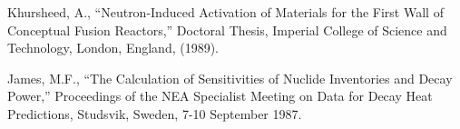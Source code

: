 \begin{thebibliography}{100}
 Khursheed, A., ``Neutron-Induced Activation of
  Materials for the First Wall of Conceptual Fusion Reactors,''
  Doctoral Thesis, Imperial College of Science and Technology, London,
  England, (1989).
    
 James, M.F., ``The Calculation of Sensitivities
  of Nuclide Inventories and Decay Power,'' Proceedings of the NEA
  Specialist Meeting on Data for Decay Heat Predictions, Studsvik,
  Sweden, 7-10 September 1987.
    
  
\end{thebibliography}
